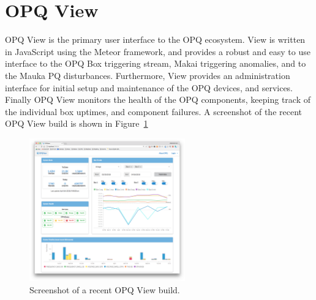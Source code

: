 \section{OPQ View}\label{sec:opq-view}

OPQ View is the primary user interface to the OPQ ecosystem.
View is written in JavaScript using the Meteor framework, and provides a robust and easy to use interface to the OPQ Box triggering stream, Makai triggering anomalies, and to the Mauka PQ disturbances.
Furthermore, View provides an administration interface for initial setup and maintenance of the OPQ devices, and services.
Finally OPQ View monitors the health of the OPQ components, keeping track of the individual box uptimes, and component failures.
A screenshot of the recent OPQ View build is shown in Figure~\ref{fig:opq:12}

\begin{figure}[h]
  \begin{center}
  \includegraphics[width=0.6\textwidth]{img/opqview-landing-page.png}
  \end{center}
  \caption{Screenshot of a recent OPQ View build.}
  \label{fig:opq:12}
\end{figure}

